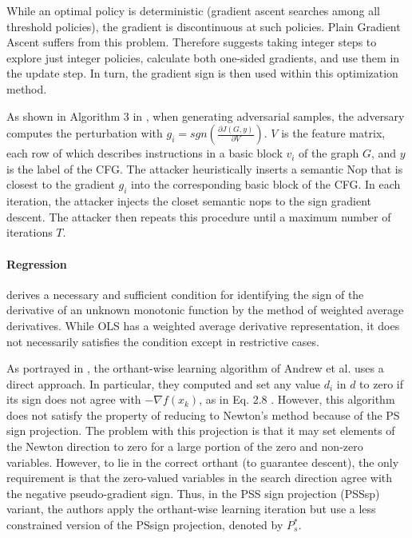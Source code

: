 \documentclass[11pt]{book}
\begin{document}
While an optimal policy is deterministic (gradient ascent searches
among all threshold policies), the gradient is discontinuous at such
policies. Plain Gradient Ascent suffers from this problem. Therefore
\cite{massaro2019optimal} suggests taking integer steps to explore
just integer policies, calculate both one-sided gradients, and use
them in the update step. In turn, the gradient sign is then used within
this optimization method.

As shown in Algorithm 3 in \cite{zhang2020semantic}, when generating
adversarial samples, the adversary computes the perturbation with
$g_{i}=sgn\left(\frac{\partial J\left(G,y\right)}{\partial V}\right)$.
$V$ is the feature matrix, each row of which describes instructions
in a basic block $v_{i}$ of the graph $G$, and $y$ is the label
of the CFG. The attacker heuristically inserts a semantic Nop that
is closest to the gradient $g_{i}$ into the corresponding basic block
of the CFG. In each iteration, the attacker injects the closet semantic
nops to the sign gradient descent. The attacker then repeats this
procedure until a maximum number of iterations $T$.

\paragraph{Regression}

\cite{inoue2002identifying} derives a necessary and sufficient condition
for identifying the sign of the derivative of an unknown monotonic
function by the method of weighted average derivatives. While OLS
has a weighted average derivative representation, it does not necessarily
satisfies the condition except in restrictive cases.

As portrayed in \cite{schmidt2010graphical}, the orthant-wise learning
algorithm of Andrew et al. uses a direct approach. In particular,
they computed and set any value $d_{i}$ in $d$ to zero if its sign
does not agree with $-\nabla f(x_{k})$, as in Eq. 2.8 . However,
this algorithm does not satisfy the property of reducing to Newton's
method because of the PS sign projection. The problem with this projection
is that it may set elements of the Newton direction to zero for a
large portion of the zero and non-zero variables. However, to lie
in the correct orthant (to guarantee descent), the only requirement
is that the zero-valued variables in the search direction agree with
the negative pseudo-gradient sign. Thus, in the PSS sign projection
(PSSsp) variant, the authors apply the orthant-wise learning iteration
but use a less constrained version of the PSsign projection, denoted
by $P_{s}^{*}$.
\end{document}

